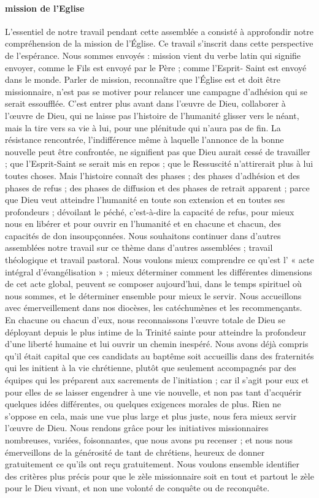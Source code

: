 \paragraph{mission de l'Eglise}
L’essentiel de notre travail pendant cette assemblée a consisté à approfondir notre compréhension de la mission de l’Église. Ce travail s’inscrit dans cette perspective de l’espérance. Nous sommes envoyés : mission vient du verbe latin qui signifie envoyer, comme le Fils est envoyé par le Père ; comme l’Esprit- Saint est envoyé dans le monde. Parler de mission, reconnaître que l’Église est et doit être
missionnaire, n’est pas se motiver pour relancer une campagne d’adhésion qui se serait essoufflée. C’est entrer plus avant dans l’œuvre de Dieu, collaborer à l’œuvre de Dieu, qui ne laisse pas l’histoire de l’humanité glisser vers le néant, mais la tire vers sa vie à lui, pour une plénitude qui n’aura pas de fin. La résistance rencontrée, l’indifférence même à laquelle l’annonce de la bonne nouvelle peut être confrontée, ne signifient pas que Dieu aurait cessé de travailler ; que l’Esprit-Saint se serait mis en repos ; que le Ressuscité n’attirerait plus à lui toutes choses. Mais l’histoire connaît des phases ; des phases d’adhésion et des phases de refus ; des phases de diffusion et des phases de retrait apparent ; parce que Dieu veut atteindre l’humanité en toute son extension et en toutes ses profondeurs ; dévoilant le péché, c’est-à-dire la capacité de refus, pour mieux nous en libérer et pour ouvrir en l’humanité et en chacune et chacun, des capacités de don insoupçonnées.
Nous souhaitons continuer dans d’autres assemblées notre travail sur ce thème dans d’autres assemblées ; travail théologique et travail pastoral. Nous voulons mieux comprendre ce qu’est l’ « acte intégral d’évangélisation » ; mieux déterminer comment les différentes dimensions de cet acte global, peuvent se composer aujourd’hui, dans le temps spirituel où nous sommes, et le déterminer ensemble pour mieux le servir. Nous accueillons avec émerveillement dans nos diocèses, les catéchumènes et les recommençants. En chacune ou chacun d’eux, nous reconnaissons l’œuvre totale de Dieu se déployant depuis le plus intime de la Trinité sainte pour atteindre la profondeur d’une liberté humaine et lui ouvrir un chemin inespéré. Nous avons déjà compris qu’il était capital que ces candidats au baptême soit accueillis dans des fraternités qui les initient à la vie chrétienne, plutôt que seulement accompagnés par des équipes qui les préparent aux sacrements de l’initiation ; car il s’agit pour eux et pour elles de se laisser engendrer à une vie nouvelle, et non pas tant d’acquérir quelques idées différentes, ou quelques exigences morales de plus. Rien ne s’oppose en cela, mais une vue plus large et plus juste, nous fera mieux servir l’œuvre de Dieu. Nous rendons grâce pour les initiatives missionnaires nombreuses, variées, foisonnantes, que nous avons pu recenser ; et nous nous émerveillons de la générosité de tant de chrétiens, heureux de donner gratuitement ce qu’ils ont reçu gratuitement. Nous voulons ensemble identifier des critères plus précis pour que le zèle missionnaire soit en tout et partout le zèle pour le Dieu vivant, et non une volonté de conquête ou de reconquête.

